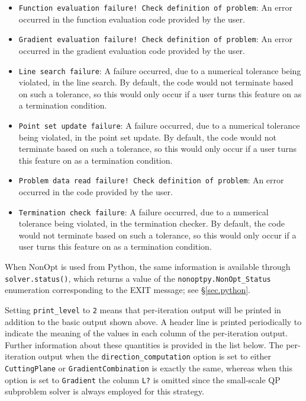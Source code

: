 \documentclass{article}
\begin{document}
\begin{itemize}
  \item \texttt{Function evaluation failure! Check definition of problem}: An error occurred in the function evaluation code provided by the user.
  \item \texttt{Gradient evaluation failure! Check definition of problem}: An error occurred in the gradient evaluation code provided by the user.
  \item \texttt{Line search failure}: A failure occurred, due to a numerical tolerance being violated, in the line search.  By default, the code would not terminate based on such a tolerance, so this would only occur if a user turns this feature on as a termination condition.
  \item \texttt{Point set update failure}: A failure occurred, due to a numerical tolerance being violated, in the point set update.  By default, the code would not terminate based on such a tolerance, so this would only occur if a user turns this feature on as a termination condition.
  \item \texttt{Problem data read failure!  Check definition of problem}: An error occurred in the code provided by the user.
  \item \texttt{Termination check failure}: A failure occurred, due to a numerical tolerance being violated, in the termination checker.  By default, the code would not terminate based on such a tolerance, so this would only occur if a user turns this feature on as a termination condition.
\end{itemize}

When NonOpt is used from Python, the same information is available through \texttt{solver.status()}, which returns a value of the \texttt{nonoptpy.NonOpt\_Status} enumeration corresponding to the EXIT message; see \S\ref{sec.python}.

Setting \texttt{print\_level} to \texttt{2} means that per-iteration output will be printed in addition to the basic output shown above.  A header line is printed periodically to indicate the meaning of the values in each column of the per-iteration output.  Further information about these quantities is provided in the list below.  The per-iteration output when the \texttt{direction\_computation} option is set to either \texttt{CuttingPlane} or \texttt{GradientCombination} is exactly the same, whereas when this option is set to \texttt{Gradient} the column \texttt{L?} is omitted since the small-scale QP subproblem solver is always employed for this strategy.
\end{document}
